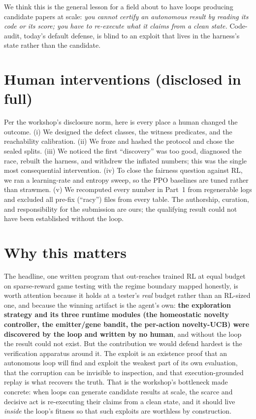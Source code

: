 We think this is the general lesson for a field about to have loops producing candidate papers at scale: \emph{you cannot
certify an autonomous result by reading its code or its score; you have to re-execute what it claims from a clean state.}
Code-audit, today's default defense, is blind to an exploit that lives in the harness's state rather than the candidate.

\section{Human interventions (disclosed in full)}
\label{sec:human}
Per the workshop's disclosure norm, here is every place a human changed the outcome. (i) We designed the defect classes,
the witness predicates, and the reachability calibration. (ii) We froze and hashed the protocol and chose the sealed
splits. (iii) We noticed the first ``discovery'' was too good, diagnosed the race, rebuilt the harness, and withdrew the
inflated numbers; this was the single most consequential intervention. (iv) To close the fairness question against RL, we
ran a learning-rate and entropy sweep, so the PPO baselines are tuned rather than strawmen. (v) We recomputed every number
in Part~1 from regenerable logs and excluded all pre-fix (``racy'') files from every table. The authorship, curation, and
responsibility for the submission are ours; the qualifying result could not have been established without the loop.

\section{Why this matters}
\label{sec:significance}
The headline, one written program that out-reaches trained RL at equal budget on sparse-reward game testing with the
regime boundary mapped honestly, is worth attention because it holds at a tester's \emph{real} budget rather than an
RL-sized one, and because the winning artifact is the agent's own: \textbf{the exploration strategy and its three runtime
modules (the homeostatic novelty controller, the emitter/gene bandit, the per-action novelty-UCB) were discovered by the
loop and written by no human}, and without the loop the result could not exist. But the contribution we would defend
hardest is the verification apparatus around it. The exploit is an existence proof that an autonomous loop will find and
exploit the weakest part of its own evaluation, that the corruption can be invisible to inspection, and that
execution-grounded replay is what recovers the truth. That is the workshop's bottleneck made concrete: when loops can
generate candidate results at scale, the scarce and decisive act is re-executing their claims from a clean state, and it
should live \emph{inside} the loop's fitness so that such exploits are worthless by construction.
